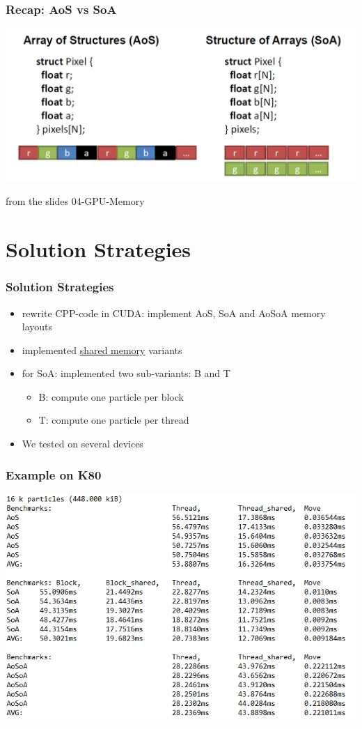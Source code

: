 \documentclass[aspectratio=169]{beamer}
\begin{document}
\begin{frame}
	\frametitle{Recap: AoS vs SoA}
	\includegraphics[scale=0.45]{resources/aos-vs-soa.png}
	
	\small from the slides 04-GPU-Memory
\end{frame}

\section{Solution Strategies}
\begin{frame}
	\frametitle{Solution Strategies}
	\begin{itemize}
		\item rewrite CPP-code in CUDA: implement AoS, SoA and AoSoA memory layouts
		\item implemented \underline{shared memory} variants
		\item for SoA: implemented two sub-variants: B and T
			\begin{itemize}
				\item B: compute one particle per block
				\item T: compute one particle per thread
			\end{itemize}
		\item We tested on several devices
	\end{itemize}
\end{frame}

\begin{frame}
	\frametitle{Example on K80}
	\includegraphics[scale=0.5]{resources/data-example.png}
\end{frame}
\end{document}
